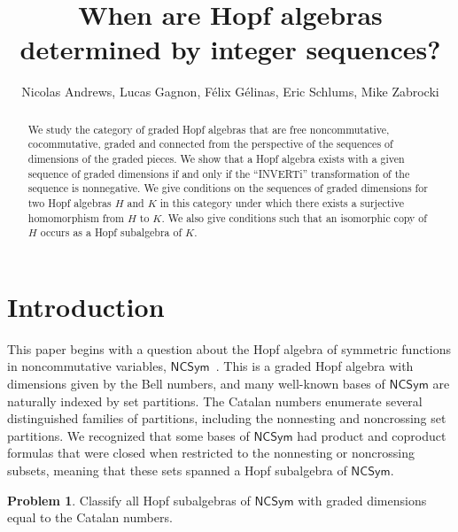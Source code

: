 \documentclass[11pt]{amsart}
\title{When are Hopf algebras determined by integer sequences?}
\author{Nicolas Andrews, Lucas Gagnon, F\'{e}lix G\'{e}linas, Eric Schlums, Mike Zabrocki}
\theoremstyle{definition}
\newtheorem{problem}[theorem]{Problem}
\numberwithin{equation}{section}
\newcommand{\NCSym}{\mathsf{NCSym}}
\begin{document}
\maketitle
\begin{abstract}
We study the category of graded Hopf algebras that are
free noncommutative, cocommutative,
graded and connected
from the perspective of the sequences of dimensions of the graded pieces.
We show that a Hopf algebra exists with a given sequence of graded dimensions
if and only if the ``INVERTi'' transformation of the sequence is nonnegative.
We give conditions on the sequences of graded dimensions for two Hopf algebras $H$ and $K$
in this category under which there exists a surjective homomorphism from $H$ to $K$.
We also give conditions such that an isomorphic copy of
$H$ occurs as a Hopf subalgebra of $K$.
\end{abstract}

\begin{comment}
We study the category of free, graded, connected, cocommutative Hopf algebras
by what can be said from the sequence of graded dimensions.
Let $\vec{a} = (a_1, a_2, a_3, \ldots)$ be a sequence of nonnegative integers,
then a Hopf algebra $H := \bigoplus_{n\geq0} H_n$ such that 
$a_n = \dim H_n$ if and only if a transformation of $\vec{a}$ is nonnegative.
If $H$ and $K$ are graded Hopf algebras then state conditions on the dimension
sequences of $H$ and $K$...
\end{comment}

\setcounter{tocdepth}{1}
\tableofcontents

\section{Introduction}

This paper begins with a question about the Hopf algebra of symmetric functions in noncommutative variables, $\NCSym$~\cite{AgEtAl12, BHRZ05, GebSag01, HNT08, RS06, W36}.  
This is a graded Hopf algebra with dimensions given by the Bell numbers, and many well-known bases of $\NCSym$ are naturally indexed by set partitions.  
The Catalan numbers enumerate several distinguished families of partitions, including the nonnesting and noncrossing set partitions.  
We recognized that some bases of $\NCSym$ had product and coproduct formulas that were closed when restricted to the nonnesting or noncrossing subsets, meaning that these sets spanned a Hopf subalgebra of $\NCSym$.

\begin{problem}
\label{problem:motivating_calatan_question}
Classify all Hopf subalgebras of $\NCSym$ with graded dimensions equal to the Catalan numbers.
\end{problem}
\end{document}
